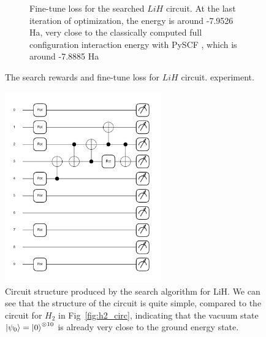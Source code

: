 \documentclass[a4paper,onecolumn,11pt]{quantumarticle}
\begin{document}
\begin{figure}[H]
\begin{subfigure}[t]{0.48\textwidth}
        \caption{Fine-tune loss for the searched $LiH$ circuit. At the last iteration of optimization, the energy is around -7.9526 Ha, very close to the classically computed full configuration interaction energy with PySCF \cite{Sun2018-nq, Sun2020-ej}, which is around -7.8885 Ha}
        \label{fig:lih_finetune}
    \end{subfigure}
    \caption{The search rewards and fine-tune loss for $LiH$ circuit. experiment.}\label{fig:lih_search_finetune}
\end{figure}

\begin{figure}[H]
  \centering
  \includegraphics[width=0.6\textwidth]{Figures/fig_lih_circ.pdf}
  \caption{Circuit structure produced by the search algorithm for LiH. We can see that the structure of the circuit is quite simple, compared to the circuit for $H_2$ in Fig~\ref{fig:h2_circ}, indicating that the vacuum state $\ket{\psi_0} = \ket{0}^{\otimes 10}$ is already very close to the ground energy state.}
  \label{fig:lih_circ}
\end{figure}
\end{document}
